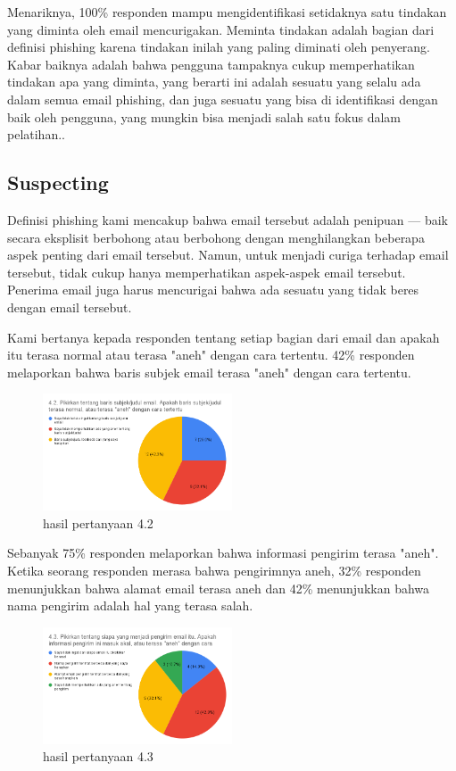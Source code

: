 \documentclass[lettersize,journal]{IEEEtran}
\begin{document}
Menariknya, 100\% responden mampu mengidentifikasi setidaknya satu tindakan yang
diminta oleh email mencurigakan. Meminta tindakan adalah bagian dari definisi
phishing karena tindakan inilah yang paling diminati oleh penyerang. Kabar
baiknya adalah bahwa pengguna tampaknya cukup memperhatikan tindakan apa yang
diminta, yang berarti ini adalah sesuatu yang selalu ada dalam semua email
phishing, dan juga sesuatu yang bisa di identifikasi dengan baik oleh pengguna, yang
mungkin bisa menjadi salah satu fokus dalam pelatihan..

\subsection{Suspecting}
Definisi phishing kami mencakup bahwa email tersebut adalah penipuan — baik
secara eksplisit berbohong atau berbohong dengan menghilangkan beberapa aspek
penting dari email tersebut. Namun, untuk menjadi curiga terhadap email
tersebut, tidak cukup hanya memperhatikan aspek-aspek email tersebut. Penerima
email juga harus mencurigai bahwa ada sesuatu yang tidak beres dengan email
tersebut.

Kami bertanya kepada responden tentang setiap bagian dari email dan apakah itu
terasa normal atau terasa "aneh" dengan cara tertentu. 42\% responden
melaporkan bahwa baris subjek email terasa "aneh" dengan cara tertentu. 

\begin{figure}[h!]
  \centering
  \includegraphics[width=0.5\textwidth]{image/4.2.png}
  \caption{hasil pertanyaan 4.2}
  \label{fig:pertanyaan_4.2}
\end{figure}

Sebanyak 75\% responden melaporkan bahwa informasi pengirim terasa "aneh".
Ketika seorang responden merasa bahwa pengirimnya aneh, 32\% responden menunjukkan bahwa alamat email terasa aneh
dan 42\% menunjukkan bahwa nama pengirim adalah hal yang terasa salah.

\begin{figure}[h!]
  \centering
  \includegraphics[width=0.5\textwidth]{image/4.3.png}
  \caption{hasil pertanyaan 4.3}
  \label{fig:pertanyaan_4.3}
\end{figure}
\end{document}
